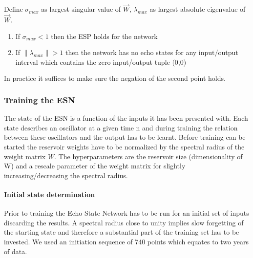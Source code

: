 \begin{frm-thm}
Define $\sigma_{max}$ as largest singular value of $\vec{W}$, $\lambda_{max}$ as largest absolute eigenvalue of $\vec{W}$.
\begin{enumerate}
\item If $\sigma_{max} < 1$ then the ESP holds for the network
\item If $\|\lambda_{max}\| > 1$ then the network has no echo states for any input/output interval which contains the zero input/output tuple (0,0)
\end{enumerate}
\end{frm-thm}
In practice it suffices to make sure the negation of the second point holds. 

\subsubsection*{Training the ESN}
The state of the ESN is a function of the inputs it has been presented with. Each state describes an oscillator at a given time n and during training the relation between these oscillators and the output has to be learnt. Before training can be started the reservoir weights have to be normalized by the spectral radius of the weight matrix $W$. The hyperparameters are the reservoir size (dimensionality of W) and a rescale parameter of the weight matrix for slightly increasing/decreasing the spectral radius.

\paragraph*{Initial state determination}
Prior to training the Echo State Network has to be run for an initial set of inputs discarding the results. A spectral radius close to unity implies slow forgetting of the starting state and therefore a substantial part of the training set has to be invested. We used an initiation sequence of 740 points which equates to two years of data.

